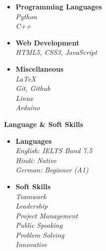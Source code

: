 \documentclass[10pt]{article} %
\begin{document}
{\begin{minipage}[t]{0.48\textwidth}
  \begin{itemize}
    \item \textbf{Programming Languages} \\
    \textit{Python} \\
    \textit{C++}
    
    \item \textbf{Web Development} \\
    \textit{HTML5, CSS3, JavaScript}
    
    \item \textbf{Miscellaneous} \\
    \textit{LaTeX} \\
    \textit{Git, Github} \\
    \textit{Linux} \\
    \textit{Arduino}
  \end{itemize}
\end{minipage}
\hfill
\begin{minipage}[t]{0.48\textwidth}
  \textbf{\large \color{slateblue} Language \& Soft Skills}

  \begin{itemize}
    \item \textbf{Languages} \\
    \textit{English: IELTS Band 7.5} \\
    \textit{Hindi: Native} \\
    \textit{German: Beginner (A1)}

    \item \textbf{Soft Skills} \\
    \textit{Teamwork} \\
    \textit{Leadership} \\
    \textit{Project Management} \\
    \textit{Public Speaking} \\
    \textit{Problem Solving} \\
    \textit{Innovative}
  \end{itemize}
\end{minipage}




}
\end{document}
